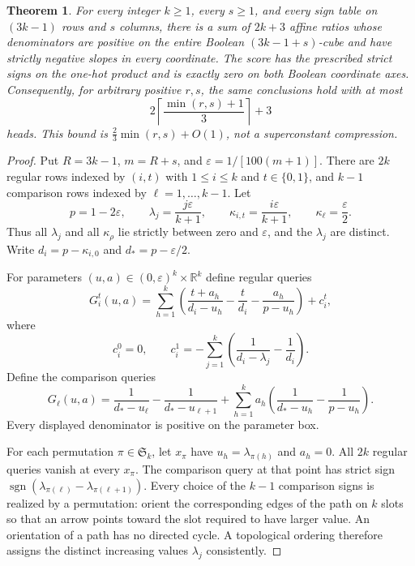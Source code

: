 \documentclass[11pt]{article}
\newtheorem{theorem}{Theorem}
\begin{document}
\begin{theorem}
For every integer $k\geq1$, every $s\geq1$, and every sign table on
$(3k-1)$ rows and $s$ columns, there is a sum of $2k+3$ affine ratios
whose denominators are positive on the entire Boolean
$(3k-1+s)$-cube and have strictly negative slopes in every coordinate.
The score has the prescribed strict signs on the one-hot product
and is exactly zero on both Boolean coordinate axes.
Consequently, for arbitrary positive $r,s$, the same conclusions hold
with at most
\[
 2\left\lceil\frac{\min(r,s)+1}{3}\right\rceil+3
\]
heads. This bound is $\frac23\min(r,s)+O(1)$, not a superconstant
compression.
\end{theorem}
\begin{proof}
Put $R=3k-1$, $m=R+s$, and $\varepsilon=1/[100(m+1)]$.
There are $2k$ regular rows indexed by $(i,t)$ with
$1\leq i\leq k$ and $t\in\{0,1\}$, and $k-1$ comparison rows
indexed by $\ell=1,\ldots,k-1$. Let
\[
 p=1-2\varepsilon,\qquad
 \lambda_j=\frac{j\varepsilon}{k+1},\qquad
 \kappa_{i,t}=\frac{i\varepsilon}{k+1},\qquad
 \kappa_\ell=\frac\varepsilon2.
\]
Thus all $\lambda_j$ and all $\kappa_\rho$ lie strictly between
zero and $\varepsilon$, and the $\lambda_j$ are distinct. Write
$d_i=p-\kappa_{i,0}$ and $d_*=p-\varepsilon/2$.

For parameters $(u,a)\in(0,\varepsilon)^k\times\mathbb R^k$
define regular queries
\[
 G_i^t(u,a)=\sum_{h=1}^k\left(
 \frac{t+a_h}{d_i-u_h}-\frac{t}{d_i}
                         -\frac{a_h}{p-u_h}\right)+c_i^t,
\]
where
\[
 c_i^0=0,\qquad
 c_i^1=-\sum_{j=1}^k\left(\frac1{d_i-\lambda_j}-\frac1{d_i}\right).
\]
Define the comparison queries
\[
 G_\ell(u,a)=\frac1{d_*-u_\ell}-\frac1{d_*-u_{\ell+1}}
       +\sum_{h=1}^k a_h\left(\frac1{d_*-u_h}-\frac1{p-u_h}\right).
\]
Every displayed denominator is positive on the parameter box.

For each permutation $\pi\in\mathfrak S_k$, let
$x_\pi$ have $u_h=\lambda_{\pi(h)}$ and $a_h=0$.
All $2k$ regular queries vanish at every $x_\pi$.
The comparison query at that point has strict sign
$\operatorname{sgn}(\lambda_{\pi(\ell)}-\lambda_{\pi(\ell+1)})$.
Every choice of the $k-1$ comparison signs is realized by a permutation:
orient the corresponding edges of the path on $k$ slots so that
an arrow points toward the slot required to have larger value.
An orientation of a path has no directed cycle. A topological ordering
therefore assigns the distinct increasing values $\lambda_j$ consistently.


\end{proof}
\end{document}

